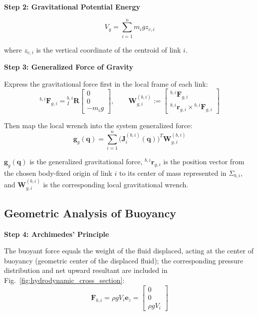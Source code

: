 \documentclass[12pt,a4paper]{report}
\newcommand{\newsymbols}[1]{\par\noindent{}#1\par\vspace{0.35em}}
\newcommand{\Frame}[1]{\Sigma_{#1}}
\begin{document}
\textbf{Step 2: Gravitational Potential Energy}

\begin{equation}
V_g = \sum_{i=1}^{n} m_i g z_{c,i}
\label{eq:old-138}
\end{equation}

where $z_{c,i}$ is the vertical coordinate of the centroid of link $i$.

\textbf{Step 3: Generalized Force of Gravity}

Express the gravitational force first in the local frame of each link:
\begin{equation}
{}^{b,i}\mathbf{F}_{g,i} = {}_{I}^{b,i}\mathbf{R}\begin{bmatrix} 0 \\ 0 \\ -m_i g \end{bmatrix},
\qquad
\mathbf{W}_{g,i}^{(b,i)} :=
\begin{bmatrix}
{}^{b,i}\mathbf{F}_{g,i} \\
{}^{b,i}\mathbf{r}_{g,i} \times {}^{b,i}\mathbf{F}_{g,i}
\end{bmatrix}
\label{eq:old-139}
\end{equation}

Then map the local wrench into the system generalized force:
\begin{equation}
\mathbf{g}_g(\mathbf{q}) = \sum_{i=1}^{n} \bigl(\mathbf{J}_i^{(b,i)}(\mathbf{q})\bigr)^T \mathbf{W}_{g,i}^{(b,i)}
\label{eq:old-140}
\end{equation}
\newsymbols{$\mathbf{g}_g(\mathbf{q})$ is the generalized gravitational force, ${}^{b,i}\mathbf{r}_{g,i}$ is the position vector from the chosen body-fixed origin of link $i$ to its center of mass represented in $\Frame{b,i}$, and $\mathbf{W}_{g,i}^{(b,i)}$ is the corresponding local gravitational wrench.}

\subsection{Geometric Analysis of Buoyancy}

\textbf{Step 4: Archimedes' Principle}

The buoyant force equals the weight of the fluid displaced, acting at the center of buoyancy (geometric center of the displaced fluid); the corresponding pressure distribution and net upward resultant are included in Fig.~\ref{fig:hydrodynamic_cross_section}:
\begin{equation}
\mathbf{F}_{b,i} = \rho g V_i \mathbf{e}_z = \begin{bmatrix} 0 \\ 0 \\ \rho g V_i \end{bmatrix}
\label{eq:old-141}
\end{equation}
\end{document}
